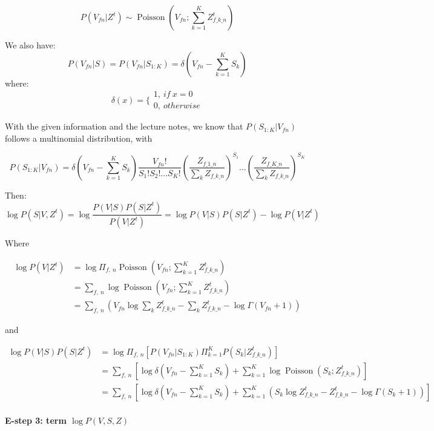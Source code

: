 \documentclass[11pt]{article}
\begin{document}
\[P(V_{fn}|Z^{t}) \sim \operatorname{Poisson}(V_{fn}; \sum_{k = 1}^{K}  Z_{f\_k\_n}^t)\]

We also have:
\[P(V_{fn}|S) = P(V_{fn}|S_{1:K}) = \delta (V_{fn}- \sum_{k = 1}^{K} S_k)\]
where: \[
\delta(x) = \{
\begin{array}{ll}
  1, \ if \ x = 0 \\
  0, \ otherwise
\end{array}
\]

With the given information and the lecture notes, we know that
\(P(S_{1:K}|V_{fn})\) follows a multinomial distribution, with

\[P(S_{1:K}|V_{fn}) =\delta (V_{fn}- \sum_{k = 1}^{K} S_k) \frac{V_{fn}!}{S_1!S_2!...S_K!}(\frac{Z_{f\_1\_n}}{\sum_k Z_{f\_k\_n}})^{S_1}...(\frac{Z_{f\_K\_n}}{\sum_k Z_{f\_k\_n}})^{S_K}\]

    Then:
\[\log P(S|V, Z^{t}) = \log \frac{P(V|S)P(S|Z^{t})}{P(V|Z^{t})} = \log P(V|S)P(S|Z^{t}) - \log P(V|Z^{t}) \]

Where

\begin{align}
\log P(V|Z^{t})
& = \log \Pi_{f,\  n} \operatorname{Poisson}(V_{fn}; \sum_{k = 1}^{K}  Z_{f\_k\_n}^t) \\
& = \sum_{f,\  n} \log \operatorname{Poisson}(V_{fn}; \sum_{k = 1}^{K}  Z_{f\_k\_n}^t) \\
&= \sum_{f,\  n} (V_{fn} \log \sum_k Z_{f\_k\_n}^t - \sum_k Z_{f\_k\_n}^t - \log \Gamma (V_{fn} + 1)) 
\end{align}

and

\begin{align}
\log P(V|S)P(S|Z^{t})
& = \log \Pi_{f,\  n} [P(V_{fn}|S_{1:K}) \Pi_{k = 1}^{K} P(S_k|Z_{f\_k\_n}^t)] \\
& = \sum_{f,\  n} [\log \delta (V_{fn}- \sum_{k = 1}^{K} S_k) + \sum_{k = 1}^{K} \log \operatorname{Poisson}(S_k; Z_{f\_k\_n}^t)] \\
&= \sum_{f,\  n} [\log \delta (V_{fn}- \sum_{k = 1}^{K} S_k) + \sum_{k = 1}^{K} (S_k \log Z_{f\_k\_n}^t - Z_{f\_k\_n}^t - \log \Gamma (S_k + 1))]
\end{align}

    \paragraph{\texorpdfstring{E-step 3: term
\(\log P(V, S, Z)\)}{E-step 3: term \textbackslash{}log P(V, S, Z)}}\label{e-step-3-term-log-pv-s-z}
\end{document}
